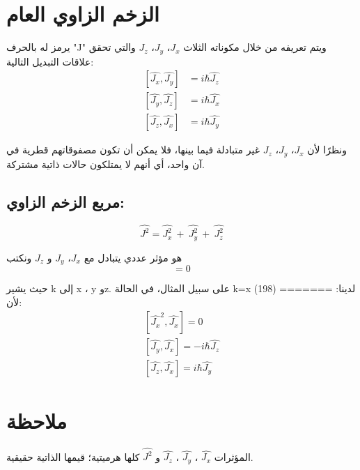 \section{الزخم الزاوي العام}
يرمز له بالحرف "J" ويتم تعريفه من خلال مكوناته الثلاث
${J}_x$، ${J}_y$، ${J}_z$
والتي تحقق علاقات التبديل التالية:
\begin{equation}
	\begin{aligned}
		[\hat{J_{x}}, \hat{J_{y}}] & =  i\hbar \hat{J_{z}}  \\
		[\hat{J_{y}}, \hat{J_{z}}] & =  i\hbar \hat{J_{x}} \\
		[\hat{J_{z}}, \hat{J_{x}}] & =  i\hbar \hat{J_{y}} 
	\end{aligned}
\end{equation}

	
	ونظرًا لأن ${J}_x$، ${J}_y$، ${J}_z$ غير متبادلة فيما بينها، فلا يمكن أن تكون مصفوقاتهم قطرية في آن واحد، أي أنهم لا يمتلكون حالات ذاتية مشتركة.  
\subsection*{مربع الزخم الزاوي:}


\begin{equation}
\hat{J^{2}} = \hat{J_{x}^{2}} ~+ ~\hat{J_{y}^{2}} ~+~ \hat{J_{z}^{2}}
\end{equation}

	هو مؤثر عددي يتبادل مع
	   ${J}_x$، ${J}_y$ و ${J}_z$ ونكتب
\begin{equation}	
	    [\hat{J}^{2}, \hat{J_{k}} ]=0
	\end{equation}


	حيث يشير k إلى  x ، y وz. على سبيل المثال، في الحالة k=x لدينا:
	======= (198)
لأن:
 \begin{equation}
 		\begin{aligned}
 	    [\hat{J_{x}}^{2}, \hat{J_{x}} ]=0\\
    	[\hat{J_{y}}, \hat{J_{x}}]  =  -i\hbar \hat{J_{z}} \\
        [\hat{J_{z}}, \hat{J_{x}}]  =  i\hbar \hat{J_{y}} 	\end{aligned}
\end{equation}

\section*{ملاحظة}

	المؤثرات  $\hat{J_{x}}$ ، $\hat{J_{y}}$ ، $\hat{J_{z}}$ و
	$\hat{J^{2}}$ كلها هرميتية؛ قيمها الذاتية حقيقية. 

